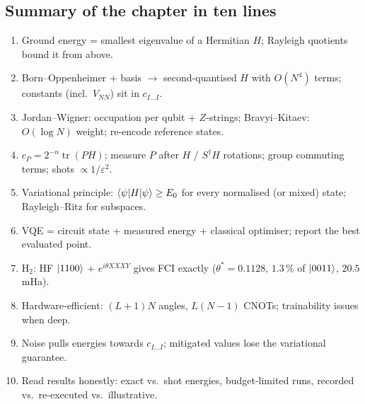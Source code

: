 \documentclass[11pt,a4paper,openany]{book}
\begin{document}
\subsection*{Summary of the chapter in ten lines}
\begin{enumerate}[itemsep=1pt]
\item Ground energy = smallest eigenvalue of a Hermitian $H$; Rayleigh quotients bound it from above.
\item Born--Oppenheimer + basis $\to$ second-quantised $H$ with $O(N^4)$ terms; constants (incl.\ $V_{NN}$) sit in $c_{I\dots I}$.
\item Jordan--Wigner: occupation per qubit + $Z$-strings; Bravyi--Kitaev: $O(\log N)$ weight; re-encode reference states.
\item $c_P = 2^{-n}\operatorname{tr}(PH)$; measure $P$ after $H$ / $S^\dagger H$ rotations; group commuting terms; shots $\propto 1/\varepsilon^2$.
\item Variational principle: $\braket{\psi|H|\psi} \ge E_0$ for every normalised (or mixed) state; Rayleigh--Ritz for subspaces.
\item VQE = circuit state + measured energy + classical optimiser; report the best evaluated point.
\item H$_2$: HF $\ket{1100}$ + $e^{i\theta XXXY}$ gives FCI exactly ($\theta^* = 0.1128$, $1.3\,\%$ of $\ket{0011}$, $20.5$ mHa).
\item Hardware-efficient: $(L+1)N$ angles, $L(N-1)$ CNOTs; trainability issues when deep.
\item Noise pulls energies towards $c_{I\dots I}$; mitigated values lose the variational guarantee.
\item Read results honestly: exact vs.\ shot energies, budget-limited runs, recorded vs.\ re-executed vs.\ illustrative.
\end{enumerate}
\end{document}
